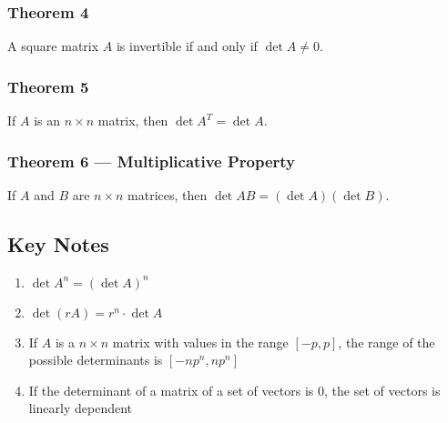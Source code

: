 \documentclass{article}
\begin{document}
\subsubsection*{Theorem 4}
A square matrix $A$ is invertible if and only if $\det A \neq 0$.

\subsubsection*{Theorem 5}
If $A$ is an $n\times n$ matrix, then $\det A^T = \det A$.

\subsubsection*{Theorem 6 --- Multiplicative Property}
If $A$ and $B$ are $n\times n$ matrices, then $\det AB = (\det A)(\det B)$.

\subsection*{Key Notes}
\begin{enumerate}
    \item $\det A^n = {(\det A)}^n$
    \item $\det (rA) = r^n \cdot \det A$
    \item If $A$ is a $n\times n$ matrix with values in the range $[-p, p]$, the range of the
    possible determinants is $[-np^n, np^n]$
    \item If the determinant of a matrix of a set of vectors is $0$, the set of vectors is linearly
    dependent
\end{enumerate}
\end{document}
